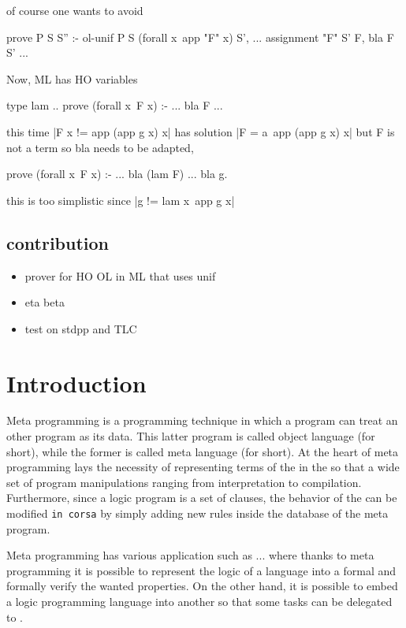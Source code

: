 \documentclass{rapport}
\begin{document}
of course one wants to avoid
\begin{elpicode}
prove P S S'' :- ol-unif P S (forall x\ app "F" x) S', ... assignment "F" S' F, bla F S' ...
\end{elpicode}

Now, ML has HO variables
\begin{elpicode}
type lam ..
prove (forall x\ F x) :- ... bla F ...
\end{elpicode}
this time  |F x != app (app g x) x| has solution
|F = a\ app (app g x) x| but F is not a term so
bla needs to be adapted,
\begin{elpicode}
prove (forall x\ F x) :- ... bla (lam F) ...
bla g.
\end{elpicode}
this is too simplistic since |g != lam x\ app g x|

\subsection{contribution}
\begin{itemize}
\item prover for HO OL in ML that uses unif
\item eta beta
\item test on stdpp and TLC
\end{itemize}


\section{Introduction}

Meta programming \cite{hill1994} is a programming technique in which a program
can treat an other program as its data. This latter program is called object
language (\ol for short), while the former is called meta language (\ml for
short). At the heart of meta programming lays the necessity of representing
terms of the \ol in the \ml so that a wide set of program
manipulations ranging from interpretation to compilation. Furthermore, since a
logic program is a set of clauses, the behavior of the \ol can be
modified \texttt{in corsa} by simply adding new rules inside the database of the meta program.

Meta programming has various application such as ... where thanks to meta
programming it is possible to represent the logic of a language into a formal
and formally verify the wanted properties. On the other hand, it is possible to
embed a logic programming language into another so that some tasks can be
delegated to \ml.
\end{document}
